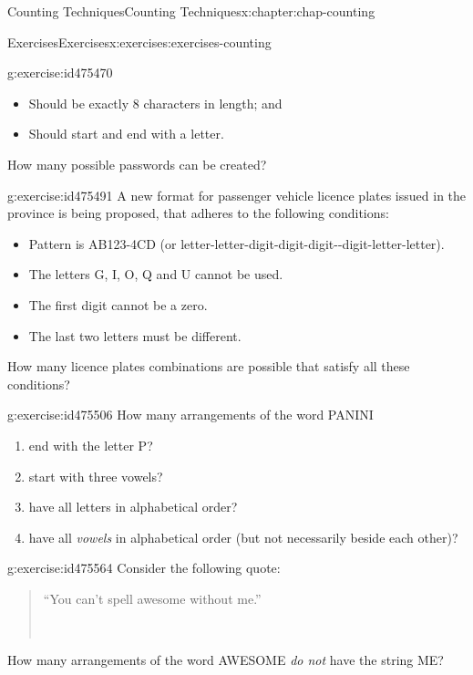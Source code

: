 \documentclass[oneside,10pt,]{book}
\numberwithin{equation}{section}
\begin{document}
\begin{chapterptx}{Counting Techniques}{}{Counting Techniques}{}{}{x:chapter:chap-counting}
\begin{exercises-section}{Exercises}{}{Exercises}{}{}{x:exercises:exercises-counting}
\begin{divisionexercise}{2}{}{}{g:exercise:id475470}
\begin{itemize}[label=\textbullet]
\item{}Should be exactly 8 characters in length; and%
\item{}Should start and end with a letter.%
\end{itemize}
How many possible passwords can be created?%
\end{divisionexercise}%
\begin{divisionexercise}{3}{}{}{g:exercise:id475491}%
A new format for passenger vehicle licence plates issued in the province is being proposed, that adheres to the following conditions:%
\begin{itemize}[label=\textbullet]
\item{}Pattern is AB123-4CD (or letter-letter-digit-digit-digit-{}-{}digit-letter-letter).%
\item{}The letters G, I, O, Q and U cannot be used.%
\item{}The first digit cannot be a zero.%
\item{}The last two letters must be different.%
\end{itemize}
How many licence plates combinations are possible that satisfy all these conditions?%
\end{divisionexercise}%
\begin{divisionexercise}{4}{}{}{g:exercise:id475506}%
How many arrangements of the word PANINI%
\begin{enumerate}[label=(\alph*)]
\item{}end with the letter P?%
\item{}start with three vowels?%
\item{}have all letters in alphabetical order?%
\item{}have all \emph{vowels} in alphabetical order (but not necessarily beside each other)?%
\end{enumerate}
%
\end{divisionexercise}%
\begin{divisionexercise}{5}{}{}{g:exercise:id475564}%
Consider the following quote:%
\begin{quote}%
``You can't spell awesome without me.''%
\nopagebreak\par%
\hfill{}\\\par
\end{quote}
How many arrangements of the word AWESOME \emph{do not} have the string ME?%

\end{divisionexercise}
\end{exercises-section}
\end{chapterptx}
\end{document}
